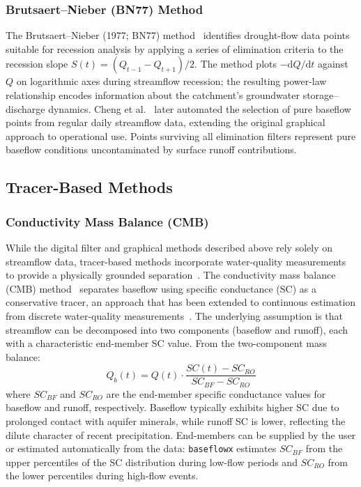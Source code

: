 \documentclass[hydrology,article,submit,pdftex,moreauthors]{Definitions/mdpi}
\begin{document}
\subsubsection{Brutsaert--Nieber (BN77) Method}

The Brutsaert--Nieber (1977; BN77) method~\cite{Brutsaert1977,Cheng2016} identifies drought-flow data points suitable for recession analysis by applying a series of elimination criteria to the recession slope $S(t) = (Q_{t-1} - Q_{t+1})/2$. The method plots $-\mathrm{d}Q/\mathrm{d}t$ against $Q$ on logarithmic axes during streamflow recession; the resulting power-law relationship encodes information about the catchment's groundwater storage--discharge dynamics. Cheng et al.~\cite{Cheng2016} later automated the selection of pure baseflow points from regular daily streamflow data, extending the original graphical approach to operational use. Points surviving all elimination filters represent pure baseflow conditions uncontaminated by surface runoff contributions.

\subsection{Tracer-Based Methods}
\label{sec:tracer}

\subsubsection{Conductivity Mass Balance (CMB)}

While the digital filter and graphical methods described above rely solely on streamflow data, tracer-based methods incorporate water-quality measurements to provide a physically grounded separation~\cite{Klaus2013}. The conductivity mass balance (CMB) method~\cite{Stewart2007} separates baseflow using specific conductance (SC) as a conservative tracer, an approach that has been extended to continuous estimation from discrete water-quality measurements~\cite{Miller2015}. The underlying assumption is that streamflow can be decomposed into two components (baseflow and runoff), each with a characteristic end-member SC value. From the two-component mass balance:
\begin{equation}
\label{eq:cmb}
Q_b(t) = Q(t) \cdot \frac{SC(t) - SC_{RO}}{SC_{BF} - SC_{RO}}
\end{equation}
where $SC_{BF}$ and $SC_{RO}$ are the end-member specific conductance values for baseflow and runoff, respectively. Baseflow typically exhibits higher SC due to prolonged contact with aquifer minerals, while runoff SC is lower, reflecting the dilute character of recent precipitation. End-members can be supplied by the user or estimated automatically from the data: \texttt{baseflowx} estimates $SC_{BF}$ from the upper percentiles of the SC distribution during low-flow periods and $SC_{RO}$ from the lower percentiles during high-flow events.
\end{document}

